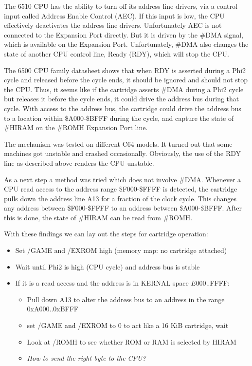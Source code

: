 \documentclass[a4paper,oneside]{memoir}
\begin{document}
The 6510 CPU has the ability to turn off its address line
drivers, via a control input called Address Enable Control (AEC). If
this input is low, the CPU effectively deactivates the address line
drivers. Unfortunately AEC is not connected to the Expansion
Port directly. But it is driven by the \#DMA signal, which is
available on the Expansion Port. Unfortunately, \#DMA also changes
the state of another CPU control line, Ready (RDY), which will stop
the CPU.

The 6500 CPU family datasheet shows that when RDY is asserted during a Phi2 cycle and released before the cycle ends, 
it should be ignored and should not stop the CPU. 
Thus, it seems like if the cartridge asserts \#DMA during a Phi2 cycle but releases it before the cycle ends, 
it could drive the address bus during that cycle.
With access to the address bus, the cartridge could drive the address bus to a location within \$A000-\$BFFF
during the cycle, and capture the state of \#HIRAM on the \#ROMH Expansion Port line.

The mechanism was tested on different C64 models. 
It turned out that some machines got unstable and crashed occasionally.
Obviously, the use of the RDY line as described above renders the CPU unstable.

As a next step a method was tried which does not involve \#DMA.
Whenever a CPU read access to the address range \$F000-\$FFFF is detected, 
the cartridge pulls down the address line A13 for a fraction of the clock cycle.
This changes any address between \$F000-\$FFFF to an address between \$A000-\$BFFF.
After this is done, the state of \#HIRAM can be read from \#ROMH.

With these findings we can lay out the steps for cartridge operation:

\begin{itemize}
\item Set /GAME and /EXROM high (memory map: no cartridge attached)
\item Wait until Phi2 is high (CPU cycle) and address bus is stable
\item If it is a read access and the address is in KERNAL space $E000..$FFFF:
    \begin{itemize}
    \item Pull down A13 to alter the address bus to an address in the range 0xA000..0xBFFF
    \item set /GAME and /EXROM to 0 to act like a 16 KiB cartridge, wait
    \item Look at /ROMH to see whether ROM or RAM is selected by HIRAM
    \item \textit{How to send the right byte to the CPU?}
    \end{itemize}
\end{itemize}
\end{document}
